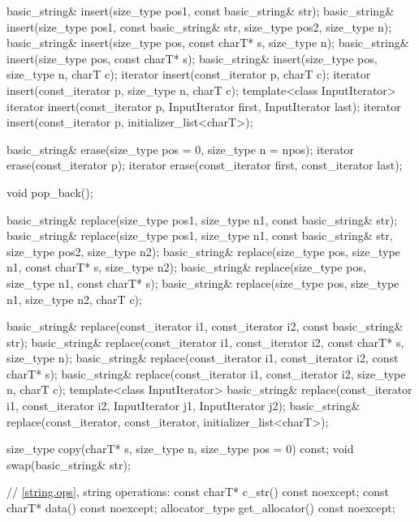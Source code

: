 \begin{codeblock}
{{    basic_string& insert(size_type pos1, const basic_string& str);
    basic_string& insert(size_type pos1, const basic_string& str,
                         size_type pos2, size_type n);
    basic_string& insert(size_type pos, const charT* s, size_type n);
    basic_string& insert(size_type pos, const charT* s);
    basic_string& insert(size_type pos, size_type n, charT c);
    iterator insert(const_iterator p, charT c);
    iterator insert(const_iterator p, size_type n, charT c);
    template<class InputIterator>
      iterator insert(const_iterator p, InputIterator first, InputIterator last);
    iterator insert(const_iterator p, initializer_list<charT>);

    basic_string& erase(size_type pos = 0, size_type n = npos);
    iterator erase(const_iterator p);
    iterator erase(const_iterator first, const_iterator last);

    void pop_back();

    basic_string& replace(size_type pos1, size_type n1,
                          const basic_string& str);
    basic_string& replace(size_type pos1, size_type n1,
                          const basic_string& str,
                          size_type pos2, size_type n2);
    basic_string& replace(size_type pos, size_type n1, const charT* s,
                          size_type n2);
    basic_string& replace(size_type pos, size_type n1, const charT* s);
    basic_string& replace(size_type pos, size_type n1, size_type n2,
                          charT c);

    basic_string& replace(const_iterator i1, const_iterator i2,
              const basic_string& str);
    basic_string& replace(const_iterator i1, const_iterator i2, const charT* s,
                          size_type n);
    basic_string& replace(const_iterator i1, const_iterator i2, const charT* s);
    basic_string& replace(const_iterator i1, const_iterator i2,
                          size_type n, charT c);
    template<class InputIterator>
      basic_string& replace(const_iterator i1, const_iterator i2,
                            InputIterator j1, InputIterator j2);
    basic_string& replace(const_iterator, const_iterator, initializer_list<charT>);

    size_type copy(charT* s, size_type n, size_type pos = 0) const;
    void swap(basic_string& str);

    // \ref{string.ops}, string operations:
    const charT* c_str() const noexcept;
    const charT* data() const noexcept;
    allocator_type get_allocator() const noexcept;

}}
\end{codeblock}
